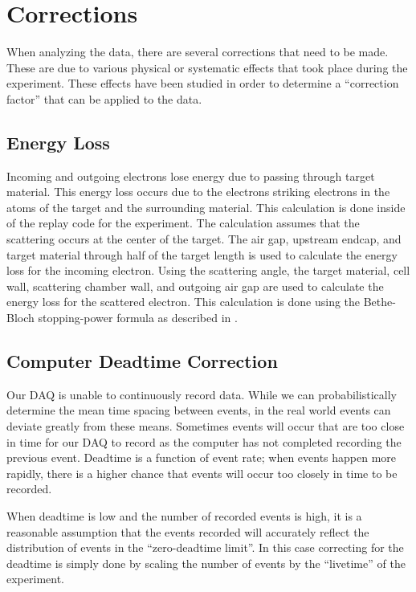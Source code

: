 \section{Corrections}

When analyzing the data, there are several corrections that need to be made. These are due to various physical or systematic effects that took place during the experiment. These effects have been studied in order to determine a ``correction factor'' that can be applied to the data.

\subsection{Energy Loss}

Incoming and outgoing electrons lose energy due to passing through target material. This energy loss occurs due to the electrons striking electrons in the atoms of the target and the surrounding material. This calculation is done inside of the replay code for the experiment. The calculation assumes that the scattering occurs at the center of the target. The air gap, upstream endcap, and target material through half of the target length is used to calculate the energy loss for the incoming electron. Using the scattering angle, the target material, cell wall, scattering chamber wall, and outgoing air gap are used to calculate the energy loss for the scattered electron. This calculation is done using the Bethe-Bloch stopping-power formula as described in \cite{eloss}.

\subsection{Computer Deadtime Correction}

Our DAQ is unable to continuously record data. While we can probabilistically determine the mean time spacing between events, in the real world events can deviate greatly from these means. Sometimes events will occur that are too close in time for our DAQ to record as the computer has not completed recording the previous event. Deadtime is a function of event rate; when events happen more rapidly, there is a higher chance that events will occur too closely in time to be recorded.

When deadtime is low and the number of recorded events is high, it is a reasonable assumption that the events recorded will accurately reflect the distribution of events in the ``zero-deadtime limit''. In this case correcting for the deadtime is simply done by scaling the number of events by the ``livetime'' of the experiment.

